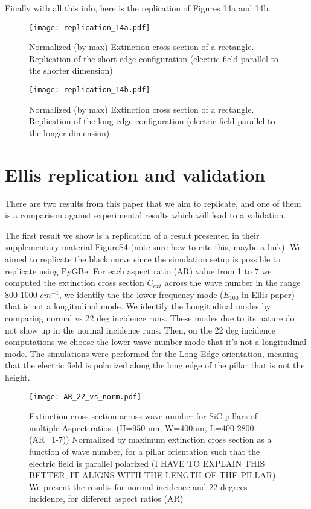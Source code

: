  Finally with all this info, here is the replication of Figures 14a and 14b. 

 \begin{figure}
    \centering
    \texttt{[image: replication\_14a.pdf]} 
    \caption{Normalized (by max) Extinction cross section of a rectangle. Replication of 
    the short edge configuration (electric field parallel to the shorter dimension)}
    \label{fig:rep_14a}
 \end{figure}

 \begin{figure}
    \centering
    \texttt{[image: replication\_14b.pdf]} 
    \caption{Normalized (by max) Extinction cross section of a rectangle. Replication of the 
    long edge configuration (electric field parallel to the longer dimension)}
    \label{fig:rep_14b}
 \end{figure}

 \section{Ellis replication and validation}

There are two results from this paper that we aim to replicate, and one of them is a comparison
against experimental results which will lead to a validation. 

The first result we show is a replication of a result presented in their supplementary 
material FigureS4 {\color{red}(note sure how to cite this, maybe a link)}. We aimed to replicate the 
black curve since the simulation setup is possible to replicate using PyGBe. For each aspect ratio (AR) 
value from 1 to 7 we computed the extinction cross section $C_{ext}$ across the wave number in the range
800-1000 $cm^{-1}$, we identify the the lower frequency mode ($E_{100}$ in Ellis paper)  that is not a 
longitudinal mode. We identify the Longitudinal modes by comparing normal vs 22 deg incidence runs. These
modes due to its nature do not show up in the normal incidence runs. Then, on the 22 deg incidence 
computations we choose the lower wave number mode that it's not a longitudinal mode. The simulations were 
performed for the Long Edge orientation, meaning that the electric field is polarized along the long edge 
of the pillar that is not the height. 

\begin{figure}
    \centering
    \texttt{[image: AR\_22\_vs\_norm.pdf]} 
    \caption{ Extinction cross section across wave number for SiC pillars of multiple Aspect ratios. 
             (H=950 nm, W=400nm, L=400-2800 (AR=1-7))
            Normalized by maximum extinction cross section as a function of wave number,
            for a pillar orientation such that the electric field is parallel polarized 
            (I HAVE TO EXPLAIN THIS BETTER, IT ALIGNS WITH THE LENGTH OF THE PILLAR). 
            We present the results for normal incidence and 22 degrees incidence, 
            for different aspect ratios (AR)
            }
    \label{fig:AR_22_vs_norm}
 \end{figure}

